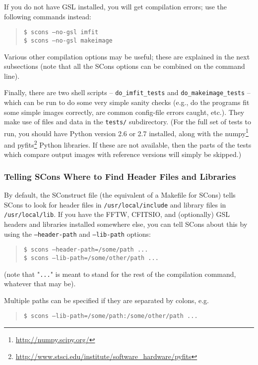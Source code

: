 \documentclass[10pt]{article}
\begin{document}
If you do not have GSL installed, you will get compilation errors; use the following
commands instead:
\begin{quote}
\texttt{\$ scons --no-gsl imfit} \\
\texttt{\$ scons --no-gsl makeimage}
\end{quote}

Various other compilation options may be useful; these are explained in the next
subsections (note that all the SCons options can be combined on the command line).

Finally, there are two shell scripts -- \texttt{do\_imfit\_tests} and \texttt{do\_makeimage\_tests} --
which can be run to do some very simple sanity checks (e.g., do the programs fit
some simple images correctly, are common config-file errors caught, etc.). They make
use of files and data in the \texttt{tests/} subdirectory. (For the full set of tests
to run, you should have Python version 2.6 or 2.7 installed, along with the
numpy\footnote{\url{http://numpy.scipy.org/}} and 
pyfits\footnote{\url{http://www.stsci.edu/institute/software_hardware/pyfits}} Python 
libraries. If these are not available, then the
parts of the tests which compare output images with reference versions will
simply be skipped.)


\subsubsection{Telling SCons Where to Find Header Files and Libraries}

By default, the SConstruct file (the equivalent of a Makefile for SCons) tells SCons
to look for header files in \texttt{/usr/local/include} and library files in
\texttt{/usr/local/lib}. If you have the FFTW, CFITSIO, and (optionally) GSL headers
and libraries installed somewhere else, you can tell SCons about this by using the
\texttt{--header-path} and \texttt{--lib-path} options:
\begin{quote}
\texttt{\$ scons --header-path=/some/path ...} \\
\texttt{\$ scons --lib-path=/some/other/path ...}
\end{quote}
(note that "\texttt{...}" is meant to stand for the rest of the compilation command,
whatever that may be).

Multiple paths can be specified if they are separated by colons, e.g.
\begin{quote}
\texttt{\$ scons --lib-path=/some/path:/some/other/path ...} \\
\end{quote}
\end{document}
